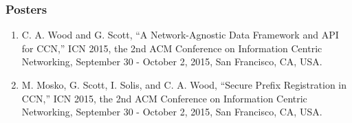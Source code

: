 \documentclass[10pt]{res} %
\begin{document}
\begin{resume}
\vspace{-15pt}
\subsubsection*{Posters}
\begin{enumerate}[P-1.]
	\item C. A. Wood and G. Scott, ``A Network-Agnostic Data Framework and API for CCN,'' ICN 2015, the 2nd ACM Conference on Information Centric Networking, September 30 - October 2, 2015, San Francisco, CA, USA.

	\item M. Mosko, G. Scott, I. Solis, and C. A. Wood, ``Secure Prefix Registration in CCN,'' ICN 2015, the 2nd ACM Conference on Information Centric Networking, September 30 - October 2, 2015, San Francisco, CA, USA.
\end{enumerate}


\vspace{-15pt}

\end{resume}
\end{document}
